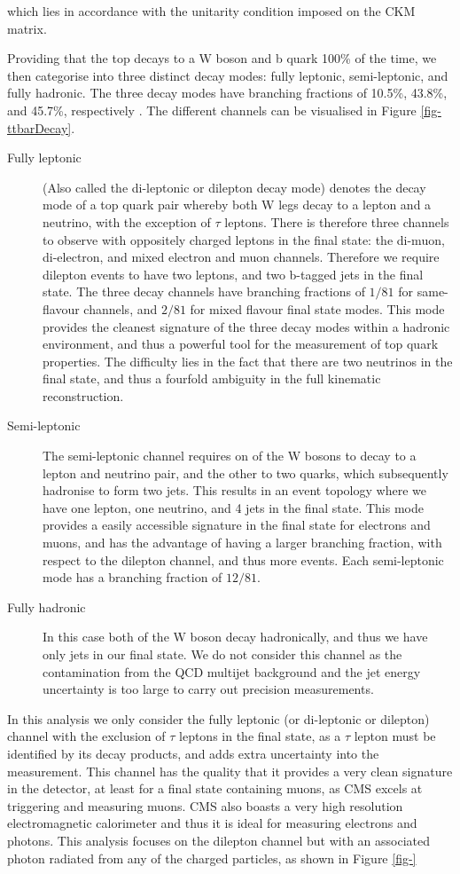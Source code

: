 which lies in accordance with the unitarity condition imposed on the CKM matrix. 

Providing that the top decays to a W boson and b quark 100\% of the time, we then categorise into three distinct decay modes: fully leptonic, semi-leptonic, and fully hadronic. The three decay modes have branching fractions of 10.5\%, 43.8\%, and 45.7\%, respectively \cite{PhysRevD.86.010001}. The different channels can be visualised in Figure \ref{fig-ttbarDecay}.

\begin{description}
	\item[Fully leptonic] (Also called the di-leptonic or dilepton decay mode) denotes the decay mode of a top quark pair whereby both W legs decay to a lepton and a neutrino, with the exception of $\tau$ leptons. There is therefore three channels to observe with oppositely charged leptons in the final state: the di-muon, di-electron, and mixed electron and muon channels. Therefore we require dilepton events to have two leptons, and two b-tagged jets in the final state. The three decay channels have branching fractions of $1/81$ for same-flavour channels, and $2/81$ for mixed flavour final state modes. This mode provides the cleanest signature of the three decay modes within a hadronic environment, and thus a powerful tool for the measurement of top quark properties. The difficulty lies in the fact that there are two neutrinos in the final state, and thus a fourfold ambiguity in the full kinematic reconstruction.
	\item[Semi-leptonic] The semi-leptonic channel requires on of the W bosons to decay to a lepton and neutrino pair, and the other to two quarks, which subsequently hadronise to form two jets. This results in an event topology where we have one lepton, one neutrino, and 4 jets in the final state. This mode provides a easily accessible signature in the final state for electrons and muons, and has the advantage of having a larger branching fraction, with respect to the dilepton channel, and thus more events. Each semi-leptonic mode has a branching fraction of $12/81$.
	\item[Fully hadronic] In this case both of the W boson decay hadronically, and thus we have only jets in our final state. We do not consider this channel as the contamination from the QCD multijet background and the jet energy uncertainty is too large to carry out precision measurements. 
\end{description}

In this analysis we only consider the fully leptonic (or di-leptonic or dilepton) channel with the exclusion of $\tau$ leptons in the final state, as a $\tau$ lepton must be identified by its decay products, and adds extra uncertainty into the measurement. This channel has the quality that it provides a very clean signature in the detector, at least for a final state containing muons, as CMS excels at triggering and measuring muons. CMS also boasts a very high resolution electromagnetic calorimeter and thus it is ideal for measuring electrons and photons. This analysis focuses on the dilepton channel but with an associated photon radiated from any of the charged particles, as shown in Figure \ref{fig-}

